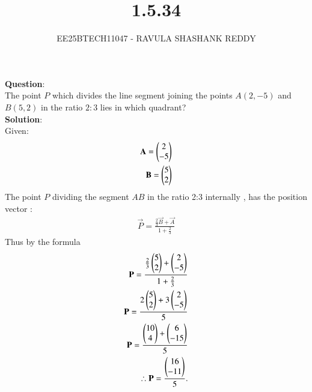 \documentclass[journal]{article}
\begin{document}
	
	
	\vspace{3cm}
	
\title{1.5.34}
\author{EE25BTECH11047 - RAVULA SHASHANK REDDY}
\maketitle
\hrulefill
\bigskip 

\renewcommand{\thefigure}{\theenumi}
\renewcommand{\thetable}{\theenumi}
\setlength{\intextsep}{10pt}

\textbf{Question}:\\

The point \(P\) which divides the line segment joining the points \(A(2,-5)\) and \(B(5,2)\) in the ratio \(2:3\) lies in which quadrant?\\

\textbf{Solution}:\\

  Given:
\begin{align}
\mathbf{A} = \begin{pmatrix}2 \\ -5\end{pmatrix} \\ \mathbf{B} = \begin{pmatrix}5 \\ 2\end{pmatrix}
\end{align}
The point \(P\) dividing the segment \(AB\) in the ratio 2:3 internally , has the position vector :
\begin{align}
\vec{P} = \frac{\frac{2}{3} \vec{B} + \vec{A}}{1 + \frac{2}{3}} 
\end{align}
Thus by the formula \\
\begin{align} 
\mathbf{P}=\frac{\frac{2}{3}\begin{pmatrix}5 \\ 2\end{pmatrix}+\begin{pmatrix}2\\-5\end{pmatrix}}{1+\frac{2}{3}}\\
\mathbf{P}= \frac{2 \begin{pmatrix}5 \\ 2\end{pmatrix} + 3\begin{pmatrix}2 \\ -5\end{pmatrix}}{5} \\ \mathbf{P}= \frac{\begin{pmatrix}10 \\ 4\end{pmatrix} + \begin{pmatrix}6 \\ -15\end{pmatrix}}{5} \\ 
\therefore \mathbf{P}= \frac{\begin{pmatrix}16 \\ -11\end{pmatrix}}{5}.
\end{align}
\end{document}
